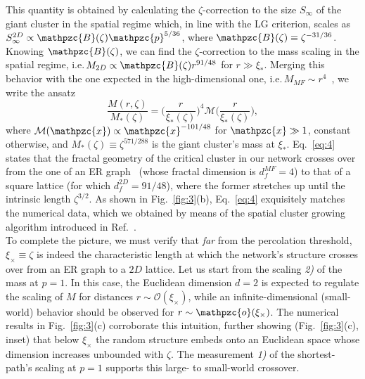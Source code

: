 \documentclass[aps, groupedaddress, superscriptaddress, prl, reprint]{revtex4-1}
\begin{document}
This quantity is obtained by calculating the $\zeta$-correction to the size $S_\infty$ of the giant cluster in the spatial regime which, in line with the LG criterion, scales as $S_\infty^{2D}\propto\mathpzc{B}(\zeta)\mathpzc{p}^{5/36}$, where $\mathpzc{B}(\zeta)\equiv\zeta^{-31/36}$. 
Knowing $\mathpzc{B}(\zeta)$, we can find the $\zeta$-correction to the mass scaling in the spatial regime, i.e.\,$M_{2D}\propto \mathpzc{B}(\zeta)r^{91/48}$ for $r\gg\xi_*$. 
Merging this behavior with the one expected in the high-dimensional one, i.e.\,$M_{MF}\sim r^{4}$~\cite{BuH012}, we write the ansatz
\begin{equation}\label{eq:4}
\frac{M(r,\zeta)}{M_*(\zeta)}=\bigg(\frac{r}{\xi_*(\zeta)}\bigg)^{\!4}\mathcal{M}\bigg(\frac{r}{\xi_*(\zeta)}\bigg),
\end{equation}
\noindent 
where $\mathcal{M}(\mathpzc{x})\propto\mathpzc{x}^{-101/48}$ for $\mathpzc{x}\gg1$, constant otherwise, and $M_*(\zeta)\equiv\zeta^{571/288}$ is the giant cluster's mass at $\xi_*$. 
Eq.~\eqref{eq:4} states that the fractal geometry of the critical cluster in our network crosses over from the one of an ER graph~\cite{CoH004} (whose fractal dimension is $d_f^{MF}=4$) to\vspace*{-0.06cm} 
\noindent 
that of a square lattice (for which $d_f^{2D}=91/48$), where\vspace*{-0.06cm} 
\noindent 
the former stretches up until the intrinsic length $\zeta^{3/2}$. 
As shown in Fig.~\ref{fig:3}(b), Eq.~\eqref{eq:4} exquisitely matches the numerical data, which we obtained by means of the spatial cluster growing algorithm introduced in Ref.~\cite{Li2011}.\\
\indent 
To complete the picture, we must verify that {\em far} from the percolation threshold, $\xi_\times\equiv\zeta$ is indeed the characteristic length at which the network's structure crosses over from an ER graph to a $2D$ lattice. 
Let us start from the scaling \emph{2)} of the mass at $p=1$. 
In this case, the Euclidean dimension $d=2$ is expected to regulate the scaling of $M$ for distances $r\sim\mathcal{O}(\xi_\times)$, while an infinite-dimensional (small-world) behavior should be observed for $r\sim\mathpzc{o}(\xi_\times)$. 
The numerical results in Fig.~\ref{fig:3}(c) corroborate this intuition, further showing (Fig.~\ref{fig:3}(c), inset) that below $\xi_\times$ the random structure embeds onto an Euclidean space whose dimension increases unbounded with $\zeta$. 
The measurement \emph{1)} of the shortest-path's scaling at $p=1$ supports this large- to small-world crossover.
\end{document}
